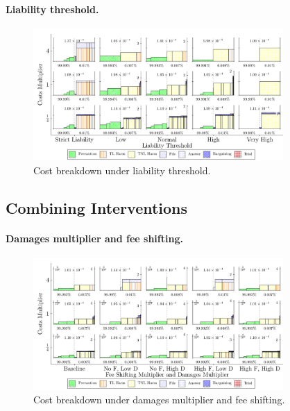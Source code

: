 \documentclass{article}
\begin{document}
\paragraph{Liability threshold.}
\begin{figure}[ht]
  \centering
  \includegraphics[width=0.85\textwidth]{../Figures/Cost Breakdown Liability Threshold (All Rows).pdf}
  \caption{Cost breakdown under liability threshold.}
  \label{fig:liability_threshold}
\end{figure}

\subsection{Combining Interventions}

\FloatBarrier
\paragraph{Damages multiplier and fee shifting.}
\begin{figure}[ht]
  \centering
  \includegraphics[width=0.85\textwidth]{../Figures/Cost Breakdown Fee Shifting Multiplier and Damages Multiplier (All Rows).pdf}
  \caption{Cost breakdown under damages multiplier and fee shifting.}
  \label{fig:dm_fee}
\end{figure}

\FloatBarrier
\end{document}
